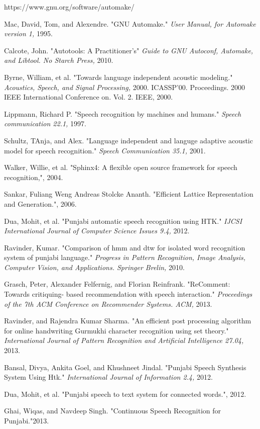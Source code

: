 \documentclass[12pt,a4paper,oldfontcommands]{memoir}
\begin{document}
\begin{thebibliography}{9}
https://www.gnu.org/software/automake/
\textit{}

Mac, David, Tom, and Alexendre. "GNU Automake."
\textit{User Manual, for Automake version 1,} 1995.

 Calcote, John. "Autotools: A Practitioner's"
\textit{Guide to GNU Autoconf, Automake, and Libtool. No Starch Press,} 2010.

Byrne, William, et al. "Towards language independent acoustic modeling."
\textit{Acoustics, Speech, and Signal Processing,} 2000. ICASSP'00. Proceedings. 2000 IEEE International Conference on. Vol. 2. IEEE, 2000.

Lippmann, Richard P. "Speech recognition by machines and humans."
\textit{Speech communication 22.1,} 1997.

 Schultz, TAnja, and Alex. "Language independent and languge adaptive acoustic model for speech recognition."
\textit{Speech Communication 35.1,} 2001.

 Walker, Willie, et al. "Sphinx4: A flexible open source framework for speech recognition,", 2004.
\textit{}

Sankar, Fuliang Weng Andreas Stolcke Ananth. "Efficient Lattice Representation and Generation.", 2006.
\textit{}

 Dua, Mohit, et al. "Punjabi automatic speech recognition using HTK."
\textit{IJCSI International Journal of Computer Science Issues 9.4,} 2012.


 Ravinder, Kumar. "Comparison of hmm and dtw for isolated word recognition system of punjabi language."
\textit{Progress in Pattern Recognition, Image Analysis, Computer Vision, and Applications. Springer Brelin,} 2010.

Grasch, Peter, Alexander Felfernig, and Florian Reinfrank. "ReComment: Towards critiquing-
based recommendation with speech interaction."
\textit{Proceedings of the 7th ACM Conference on Recommender Systems. ACM,} 2013.

Ravinder, and Rajendra Kumar Sharma. "An efficient post processing algorithm for online handwriting Gurmukhi character recognition using set theory."
\textit{International Journal of Pattern Recognition and Artificial Intelligence 27.04,} 2013.

Bansal, Divya, Ankita Goel, and Khushneet Jindal. "Punjabi Speech Synthesis System Using Htk."
\textit{International Journal of Information 2.4,} 2012.

Dua, Mohit, et al. "Punjabi speech to text system for connected words.", 2012.
\textit{}

\bibitem{}Ghai, Wiqas, and Navdeep Singh. "Continuous Speech Recognition for Punjabi."2013.
\textit{}

\end{thebibliography}
\end{document}

